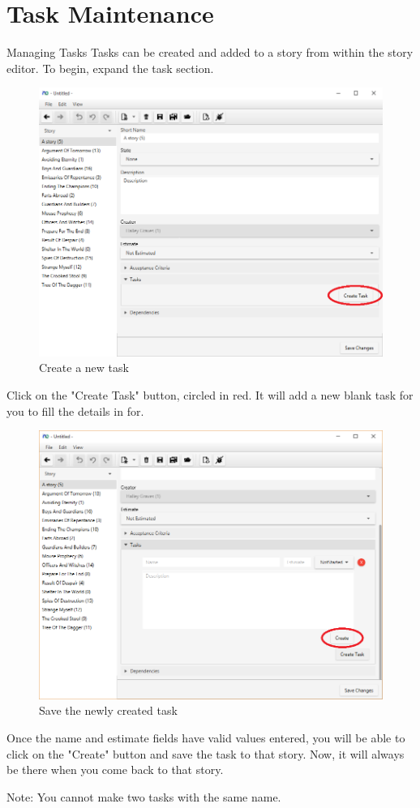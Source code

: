 \section{Task Maintenance}

Managing Tasks
\newline
Tasks can be created and added to a story from within the story editor. To begin, expand the task section.

\begin{figure}[H]
\centering
\includegraphics[width=\textwidth]{images/screenshots/task_1.png}
\caption{Create a new task}
\label{fig:new_project}
\end{figure}

Click on the "Create Task" button, circled in red. It will add a new blank task for you to fill the details in for.

\begin{figure}[H]
\centering
\includegraphics[width=\textwidth]{images/screenshots/task_2.png}
\caption{Save the newly created task}
\label{fig:new_project}
\end{figure}

Once the name and estimate fields have valid values entered, you will be able to click on the "Create" button and save the task to that story. Now, it will always be there when you come back to that story.

\newline

Note:
\newline
You cannot make two tasks with the same name.